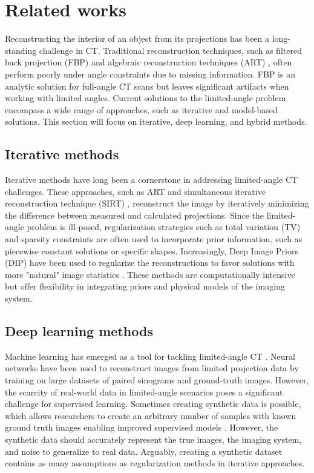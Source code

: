 \section{Related works}
Reconstructing the interior of an object from its projections has been a long-standing challenge in CT. Traditional reconstruction
techniques, such as filtered back projection (FBP) \cite{hounsfield1973computerized} and algebraic
reconstruction techniques (ART) \cite{gordon1970algebraic}, often perform poorly under angle constraints due to missing information. FBP is an analytic solution for full-angle CT scans but leaves significant artifacts when working with limited angles. Current solutions to the limited-angle problem encompass a wide range of approaches, such as iterative and model-based solutions. This section will focus on iterative, deep learning, and hybrid methods.

\subsection{Iterative methods}
Iterative methods have long been a cornerstone in addressing limited-angle CT challenges. These approaches, such as ART and simultaneous iterative reconstruction technique (SIRT) \cite{gilbert1972iterative}, reconstruct the image by iteratively minimizing the difference between measured and calculated projections. Since the limited-angle problem is ill-posed, regularization strategies such as total variation (TV) \cite{estrela2016total} and sparsity constraints \cite{candes2006robust} are often used to incorporate prior information, such as piecewise constant solutions or specific shapes. Increasingly, Deep Image Priors (DIP) \cite{ulyanov2018deep} have been used to regularize the reconstructions to favor solutions with more "natural" image statistics \cite{ferreira2023deep,barutcu2021limited}.
These methods are computationally intensive but offer flexibility in integrating priors and physical models of the imaging system.

\subsection{Deep learning methods}
Machine learning has emerged as a tool for tackling limited-angle CT \cite{arndt2023model,germer2023limited,huang2020limited,zhang2016image}.
Neural networks have been used to reconstruct images from limited projection data by training on large datasets of paired sinograms and ground-truth images. However, the scarcity of real-world data in limited-angle scenarios poses a significant challenge for supervised learning.
Sometimes creating synthetic data is possible, which allows researchers to create an arbitrary number of samples with known ground truth images enabling improved supervised models \cite{germer2023limited,wang2020deep, zhou2019limited}.
However, the synthetic data should accurately represent the true images, the imaging system, and noise to generalize to real data. Arguably, creating a synthetic dataset contains as many assumptions as regularization methods in iterative approaches.


